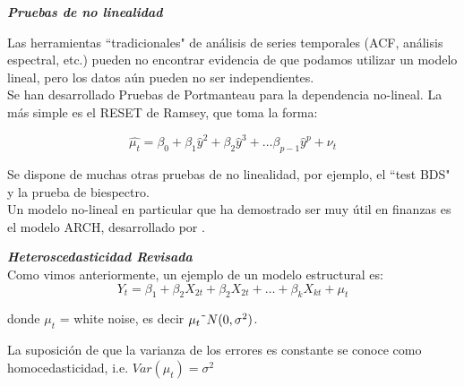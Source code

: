 \textit{\textbf{Pruebas de no linealidad}}
	
	Las herramientas ``tradicionales" de an\'alisis de series temporales (ACF, an\'alisis espectral, etc.) pueden no encontrar evidencia de que podamos utilizar un modelo lineal, pero los datos a\'un pueden no ser independientes.\\
	Se han desarrollado Pruebas de Portmanteau para la dependencia no-lineal. La m\'as simple es el RESET de Ramsey, que toma la forma: 	
	
	\begin{equation}
	\hat{\mu_t} = \beta_0 + \beta_1 \hat{y}^2+ \beta_2 \hat{y}^3+\dots{}\beta_{p-1} \hat{y}^p+ \nu_t
	\end{equation}
	
	Se dispone de muchas otras pruebas de no linealidad, por ejemplo, el ``test BDS" y la prueba de biespectro.\\
	Un modelo no-lineal en particular que ha demostrado ser muy \'util en finanzas es el modelo ARCH, desarrollado por \cite{engle1982autoregressive}.
	

	\textit{\textbf{Heteroscedasticidad Revisada}}\\
	Como vimos anteriormente, un ejemplo de un modelo estructural es:\\
	\begin{equation}
	Y_t = \beta_1 + \beta_2 X_{2t} + \beta_2 X_{2t} + \dots{} + \beta_k X_{kt} +\mu_t 
	\end{equation}
	\vspace{2mm}	
	
	donde $\mu_t$ = white noise, es decir $\mu_t \string~N(0,\sigma^2)$.\\
	\vspace{2mm}	
	
	La suposici\'on de que la varianza de los errores es constante se conoce como homocedasticidad, i.e. $Var(\mu_t)=\sigma^2$\\
	\vspace{2mm}	
	
